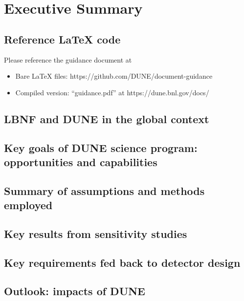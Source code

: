 \chapter{Executive Summary}
\label{ch:exec-summ}

\section{Reference LaTeX code}

Please reference the guidance document at 

\begin{itemize}
\item Bare LaTeX files: https://github.com/DUNE/document-guidance
\item Compiled version: ``guidance.pdf'' at https://dune.bnl.gov/docs/
\end{itemize}


\section{LBNF and DUNE in the global context}
\label{sec:exec-glob-context}


\section{Key goals of DUNE science program: opportunities and capabilities}
\label{sec:exec-key-goals}


\section{Summary of assumptions and methods employed}
\label{sec:exec-assm-meth}



\section{Key results from sensitivity studies}
\label{sec:exec-sensitiv-results}



\section{Key requirements fed back to detector design}
\label{sec:exec-key-reqs}



\section{Outlook: impacts of DUNE}
\label{sec:exec-impacts}


